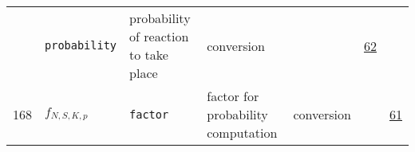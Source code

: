 \begin{longtable}{|p{1cm}|p{2.5cm}|p{4.5cm}|p{8cm}|p{3.0cm}|p{3cm}|p{1cm}|}
             & \verb|probability|
             & probability of reaction to take place
             & \begin{lay}conversion \end{lay}
             & $  $
             &                 \hyperlink{"e:62"}{ 62 }
                 \\
            168
             & \hypertarget{"v:168"}{ $ {f}{_{N, S, K, p}} $}
             & \verb|factor|
             & factor for probability computation
             & \begin{lay}conversion \end{lay}
             & $  $
             &                 \hyperlink{"e:61"}{ 61 }
                 \\
    \end{longtable}